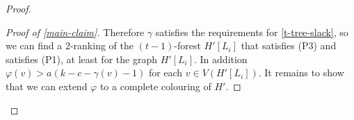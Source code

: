 \documentclass[kpfonts]{patmorin}
\theoremstyle{named}
\begin{document}
\begin{proof}
\begin{proof}[Proof of \cref{main-claim}]
       Therefore $\gamma$ satisfies the requirements for \cref{t-tree-slack}, so we can find a 2-ranking of the $(t-1)$-forest $H'[L_i]$ that satisfies (P3) and satisfies (P1), at least for the graph $H'[L_i]$. In addition $\varphi(v)> a(k-c-\gamma(v)-1)$ for each $v\in V(H'[L_i])$.  It remains to show that we can extend $\varphi$ to a complete colouring of $H'$.


\end{proof}
\end{proof}
\end{document}

